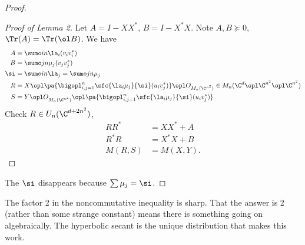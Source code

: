 \begin{proof}
\begin{proof}[Proof of Lemma 2]
Let $A=I-XX^*$, $B=I-X^*X$.  Note $A,B\succeq 0$, $\Tr(A) = \Tr(\ol B)$. We have
\begin{align}
A&=\sumo in \la_i (v_iv_i^*)\\
B&= \sumo jn \mu_j(v_jv_j^*)\\
\si &= \sumo in \la_j  =\sumo jn \mu_j\\
R&= X\opl \pa{
\bigopl_{i,j=1}^n \sfc{\la_i\mu_j}{\si}(u_iv_j^*)
} \opl O_{M_n(\C^{n^2})} \in M_n(\C^d\opl \C^{n^2}\opl \C^{n^2})\\
S&=Y\opl O_{M_n(\C^{n^2})} \opl \pa{\bigopl_{i,j=1}^n \sfc{\la_i\mu_j}{\si}(u_iv_j^*)}
\end{align}
Check $R\in U_n(\C^{d+2n^2})$, 
\begin{align}
RR^* &= XX^*+A\\
R^*R&= X^*X +B\\
M(R,S)&= M(X,Y).
\end{align}
\end{proof}
The $\si$ disappears because $\sum \mu_j=\si$.
\end{proof}
The factor 2 in the noncommutative inequality is sharp. That the answer is 2 (rather than some strange constant) means there is something going on algebraically. The hyperbolic secant is the unique distribution that makes this work.



